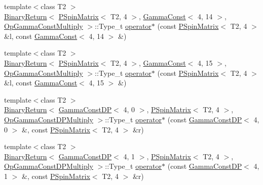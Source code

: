 \begin{DoxyCompactItemize}
\item 
{\footnotesize template$<$class T2 $>$ }\\\mbox{\hyperlink{structENSEM_1_1BinaryReturn}{Binary\+Return}}$<$ \mbox{\hyperlink{classENSEM_1_1PSpinMatrix}{P\+Spin\+Matrix}}$<$ T2, 4 $>$, \mbox{\hyperlink{classENSEM_1_1GammaConst}{Gamma\+Const}}$<$ 4, 14 $>$, \mbox{\hyperlink{structENSEM_1_1OpGammaConstMultiply}{Op\+Gamma\+Const\+Multiply}} $>$\+::Type\+\_\+t \mbox{\hyperlink{group__primspinmatrix_ga45919c652c2dae5905f239b2f35eb67c}{operator$\ast$}} (const \mbox{\hyperlink{classENSEM_1_1PSpinMatrix}{P\+Spin\+Matrix}}$<$ T2, 4 $>$ \&l, const \mbox{\hyperlink{classENSEM_1_1GammaConst}{Gamma\+Const}}$<$ 4, 14 $>$ \&)
\item 
{\footnotesize template$<$class T2 $>$ }\\\mbox{\hyperlink{structENSEM_1_1BinaryReturn}{Binary\+Return}}$<$ \mbox{\hyperlink{classENSEM_1_1PSpinMatrix}{P\+Spin\+Matrix}}$<$ T2, 4 $>$, \mbox{\hyperlink{classENSEM_1_1GammaConst}{Gamma\+Const}}$<$ 4, 15 $>$, \mbox{\hyperlink{structENSEM_1_1OpGammaConstMultiply}{Op\+Gamma\+Const\+Multiply}} $>$\+::Type\+\_\+t \mbox{\hyperlink{group__primspinmatrix_ga155437c338ef3cef89bff41046cde747}{operator$\ast$}} (const \mbox{\hyperlink{classENSEM_1_1PSpinMatrix}{P\+Spin\+Matrix}}$<$ T2, 4 $>$ \&l, const \mbox{\hyperlink{classENSEM_1_1GammaConst}{Gamma\+Const}}$<$ 4, 15 $>$ \&)
\item 
{\footnotesize template$<$class T2 $>$ }\\\mbox{\hyperlink{structENSEM_1_1BinaryReturn}{Binary\+Return}}$<$ \mbox{\hyperlink{classENSEM_1_1GammaConstDP}{Gamma\+Const\+DP}}$<$ 4, 0 $>$, \mbox{\hyperlink{classENSEM_1_1PSpinMatrix}{P\+Spin\+Matrix}}$<$ T2, 4 $>$, \mbox{\hyperlink{structENSEM_1_1OpGammaConstDPMultiply}{Op\+Gamma\+Const\+D\+P\+Multiply}} $>$\+::Type\+\_\+t \mbox{\hyperlink{group__primspinmatrix_ga48316ae1067c59ec664fcd1c4d26042a}{operator$\ast$}} (const \mbox{\hyperlink{classENSEM_1_1GammaConstDP}{Gamma\+Const\+DP}}$<$ 4, 0 $>$ \&, const \mbox{\hyperlink{classENSEM_1_1PSpinMatrix}{P\+Spin\+Matrix}}$<$ T2, 4 $>$ \&r)
\item 
{\footnotesize template$<$class T2 $>$ }\\\mbox{\hyperlink{structENSEM_1_1BinaryReturn}{Binary\+Return}}$<$ \mbox{\hyperlink{classENSEM_1_1GammaConstDP}{Gamma\+Const\+DP}}$<$ 4, 1 $>$, \mbox{\hyperlink{classENSEM_1_1PSpinMatrix}{P\+Spin\+Matrix}}$<$ T2, 4 $>$, \mbox{\hyperlink{structENSEM_1_1OpGammaConstDPMultiply}{Op\+Gamma\+Const\+D\+P\+Multiply}} $>$\+::Type\+\_\+t \mbox{\hyperlink{group__primspinmatrix_gaa16aa59946d908b7254dc099e2518fc0}{operator$\ast$}} (const \mbox{\hyperlink{classENSEM_1_1GammaConstDP}{Gamma\+Const\+DP}}$<$ 4, 1 $>$ \&, const \mbox{\hyperlink{classENSEM_1_1PSpinMatrix}{P\+Spin\+Matrix}}$<$ T2, 4 $>$ \&r)

\end{DoxyCompactItemize}
